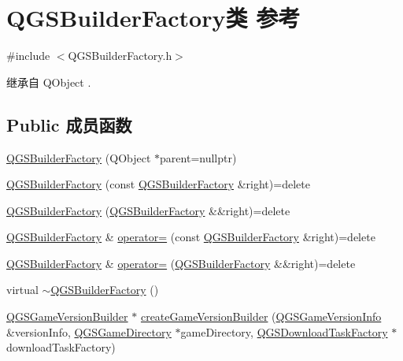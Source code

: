 \hypertarget{class_q_g_s_builder_factory}{}\section{Q\+G\+S\+Builder\+Factory类 参考}
\label{class_q_g_s_builder_factory}


{\ttfamily \#include $<$Q\+G\+S\+Builder\+Factory.\+h$>$}



继承自 Q\+Object .

\subsection*{Public 成员函数}
\begin{DoxyCompactItemize}
\item 
\mbox{\hyperlink{class_q_g_s_builder_factory_a8bb3f9520e2787f2a69b32919cf4af1b}{Q\+G\+S\+Builder\+Factory}} (Q\+Object $\ast$parent=nullptr)
\item 
\mbox{\hyperlink{class_q_g_s_builder_factory_aee122406cbf4da9378d8896e145575d0}{Q\+G\+S\+Builder\+Factory}} (const \mbox{\hyperlink{class_q_g_s_builder_factory}{Q\+G\+S\+Builder\+Factory}} \&right)=delete
\item 
\mbox{\hyperlink{class_q_g_s_builder_factory_ad3e6b89b6d2779e2e156dc534b80234c}{Q\+G\+S\+Builder\+Factory}} (\mbox{\hyperlink{class_q_g_s_builder_factory}{Q\+G\+S\+Builder\+Factory}} \&\&right)=delete
\item 
\mbox{\hyperlink{class_q_g_s_builder_factory}{Q\+G\+S\+Builder\+Factory}} \& \mbox{\hyperlink{class_q_g_s_builder_factory_a92233d3e5c3ec0a59213d4f94196db67}{operator=}} (const \mbox{\hyperlink{class_q_g_s_builder_factory}{Q\+G\+S\+Builder\+Factory}} \&right)=delete
\item 
\mbox{\hyperlink{class_q_g_s_builder_factory}{Q\+G\+S\+Builder\+Factory}} \& \mbox{\hyperlink{class_q_g_s_builder_factory_a91b7a1ee032fa1449eca3c2a6d826b3b}{operator=}} (\mbox{\hyperlink{class_q_g_s_builder_factory}{Q\+G\+S\+Builder\+Factory}} \&\&right)=delete
\item 
virtual \mbox{\hyperlink{class_q_g_s_builder_factory_ad7338089319bdbdb298ab11f4fd9b9f6}{$\sim$\+Q\+G\+S\+Builder\+Factory}} ()
\item 
\mbox{\hyperlink{class_q_g_s_game_version_builder}{Q\+G\+S\+Game\+Version\+Builder}} $\ast$ \mbox{\hyperlink{class_q_g_s_builder_factory_af266a84c6be8f7ac82f44f1d56111a6b}{create\+Game\+Version\+Builder}} (\mbox{\hyperlink{class_q_g_s_game_version_info}{Q\+G\+S\+Game\+Version\+Info}} \&version\+Info, \mbox{\hyperlink{class_q_g_s_game_directory}{Q\+G\+S\+Game\+Directory}} $\ast$game\+Directory, \mbox{\hyperlink{class_q_g_s_download_task_factory}{Q\+G\+S\+Download\+Task\+Factory}} $\ast$download\+Task\+Factory)

\end{DoxyCompactItemize}
